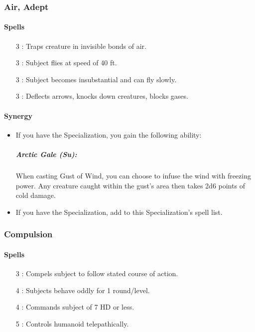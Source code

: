 \subsubsection{Air, Adept}
\paragraph{Spells}
\begin{itemize}
 \item[3] : Traps creature in invisible bonds of air.
 \item[3] : Subject flies at speed of 40 ft.
 \item[3] : Subject becomes insubstantial and can fly slowly.
 \item[3] : Deflects arrows, knocks down creatures, blocks gases.
\end{itemize}
\paragraph{Synergy}
\begin{itemize}
 \item If you have the  Specialization, you gain the following ability:
 \subparagraph{Arctic Gale (Su):} When casting Gust of Wind, you can choose to infuse the wind with freezing power. Any creature caught within the gust's area then takes 2d6 points of cold damage.
 \item If you have the  Specialization, add  to this Specialization's spell list.
\end{itemize}

\subsubsection{Compulsion}
\label{Spec:Compulsion}
\paragraph{Spells}
\begin{itemize}
 \item[3] : Compels subject to follow stated course of action.
 \item[4] : Subjects behave oddly for 1 round/level.
 \item[4] : Commands subject of 7 HD or less.
 \item[5] : Controls humanoid telepathically.
\end{itemize}

